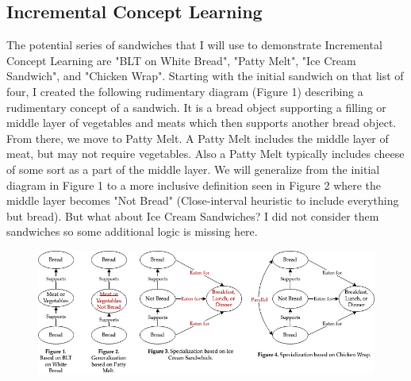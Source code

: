 \documentclass[
	letterpaper, %
]{jdf}
\begin{document}
\subsection{Incremental Concept Learning}
The potential series of sandwiches that I will use to demonstrate Incremental Concept Learning are "BLT on White Bread", "Patty Melt", "Ice Cream Sandwich", and "Chicken Wrap". Starting with the initial sandwich on that list of four, I created the following rudimentary diagram (Figure 1) describing a rudimentary concept of a sandwich. It is a bread object supporting a filling or middle layer of vegetables and meats which then supports another bread object. From there, we move to Patty Melt. A Patty Melt includes the middle layer of meat, but may not require vegetables. Also a Patty Melt typically includes cheese of some sort as a part of the middle layer. We will generalize from the initial diagram in Figure 1 to a more inclusive definition seen in Figure 2 where the middle layer becomes "Not Bread" (Close-interval heuristic to include everything but bread). But what about Ice Cream Sandwiches? I did not consider them sandwiches so some additional logic is missing here. 

\begin{figure}[h]
	\centering
	\includegraphics{Sandwich Figures.jpg}
	\label{fig:flowchart}
\end{figure}
\end{document}
